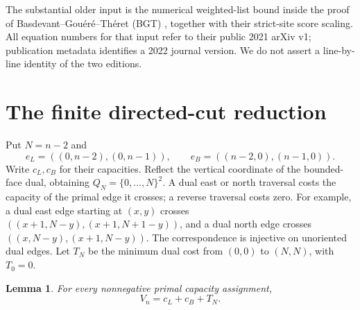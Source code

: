 \documentclass[11pt]{article}
\newtheorem{lemma}{Lemma}
\begin{document}
The substantial older input is the numerical weighted-list bound
inside the proof of Basdevant--Gou\'er\'e--Th\'eret (BGT)
\cite[\S3.3, equation (33)]{BGT}, together with their strict-site score
scaling. All equation numbers for that input refer to their public
2021 arXiv v1; publication metadata identifies a 2022 journal version.
We do not assert a line-by-line identity of the two editions.

\section{The finite directed-cut reduction}

Put $N=n-2$ and
\[
 e_L=((0,n-2),(0,n-1)),\qquad
 e_B=((n-2,0),(n-1,0)).
\]
Write $c_L,c_B$ for their capacities. Reflect the vertical coordinate
of the bounded-face dual, obtaining $Q_N=\{0,\ldots,N\}^2$. A dual
east or north traversal costs the capacity of the primal edge it
crosses; a reverse traversal costs zero. For example, a dual east
edge starting at $(x,y)$ crosses
$((x+1,N-y),(x+1,N+1-y))$, and a dual north edge crosses
$((x,N-y),(x+1,N-y))$. The correspondence is injective on unoriented
dual edges. Let $T_N$ be the minimum dual cost from $(0,0)$ to
$(N,N)$, with $T_0=0$.

\begin{lemma}\label{dual}
For every nonnegative primal capacity assignment,
\begin{equation}\label{identity}
 V_n=c_L+c_B+T_N.
\end{equation}
\end{lemma}
\end{document}
